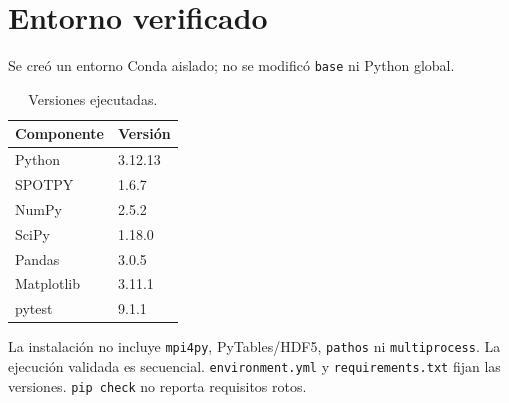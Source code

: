 \chapter{Entorno verificado}
Se creó un entorno Conda aislado; no se modificó \texttt{base} ni Python global.
\begin{table}[htbp]\centering\caption{Versiones ejecutadas.}\label{tab:versions}
\begin{tabular}{ll}\toprule Componente & Versión\\\midrule
Python & 3.12.13\\ SPOTPY & 1.6.7\\ NumPy & 2.5.2\\ SciPy & 1.18.0\\ Pandas & 3.0.5\\ Matplotlib & 3.11.1\\ pytest & 9.1.1\\\bottomrule
\end{tabular}\end{table}

La instalación no incluye \texttt{mpi4py}, PyTables/HDF5, \texttt{pathos} ni \texttt{multiprocess}. La ejecución validada es secuencial. \texttt{environment.yml} y \texttt{requirements.txt} fijan las versiones. \texttt{pip check} no reporta requisitos rotos.

